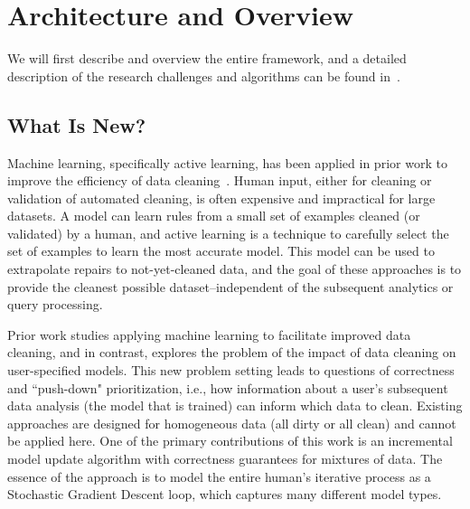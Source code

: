 \section{Architecture and Overview}\label{arch}
We will first describe \sys and overview the entire framework, and a detailed description of the research challenges and algorithms can be found in~\cite{activecleanarxiv}.

\subsection{What Is New?}
Machine learning, specifically active learning, has been applied in prior work to improve the efficiency of data cleaning~\cite{yakout2013don,DBLP:journals/pvldb/YakoutENOI11,gokhale2014corleone}.
Human input, either for cleaning or validation of automated cleaning, is often expensive and impractical for large datasets.
A model can learn rules from a small set of examples cleaned (or validated) by a human, and active learning is a technique to carefully select the set of examples to learn the most accurate model.
This model can be used to extrapolate repairs to not-yet-cleaned data, and the goal of these approaches is to provide the cleanest possible dataset--independent of the subsequent analytics or query processing.

Prior work studies applying machine learning to facilitate improved data cleaning, and in contrast, \sys explores the problem of the impact of data cleaning on user-specified models.
This new problem setting leads to questions of correctness and ``push-down" prioritization, i.e., how information about a user's subsequent data analysis (the model that is trained) can inform which data to clean.
Existing approaches are designed for homogeneous data (all dirty or all clean) and cannot be applied here.
One of the primary contributions of this work is an incremental model update algorithm with correctness guarantees for mixtures of data.
The essence of the approach is to model the entire human's iterative process as a Stochastic Gradient Descent loop, which captures many different model types.

